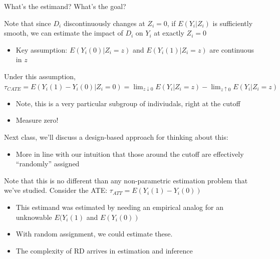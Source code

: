 \documentclass[notes,11pt, aspectratio=169]{beamer}
\newenvironment{wideitemize}{\itemize\addtolength{\itemsep}{10pt}}{\enditemize}
\begin{document}
\begin{frame}{What's the estimand? What's the goal?}
  \begin{wideitemize}
  \item Note that since $D_{i}$ discontinuously changes at
    $Z_{i} = 0$, if $E(Y_{i}|Z_{i})$ is sufficiently smooth, we can
    estimate the impact of $D_{i}$ on $Y_{i}$ at exactly $Z_{i} = 0$
    \begin{itemize}
    \item Key assumption: $E(Y_{i}(0) | Z_{i} = z)$ and
      $E(Y_{i}(1) | Z_{i} = z)$ are continuous in $z$
    \end{itemize}
  \item Under this assumption,  $\tau_{CATE} = E(Y_{i}(1) - Y_{i}(0) | Z_{i} = 0) = \lim_{z \downarrow 0}E(Y_{i} | Z_{i}= z) - \lim_{z \uparrow 0}E(Y_{i} | Z_{i}= z)$
    \begin{itemize}
    \item Note, this is a very particular subgroup of indiviudals, right at the cutoff
    \item Measure zero!
    \end{itemize}
  \item Next class, we'll discuss a design-based approach for thinking about this:
    \begin{itemize}
    \item More in line with our intuition that those around the cutoff
      are effectively ``randomly'' assigned
    \end{itemize}
  \item Note that this is no different than any non-parametric
    estimation problem that we've studied. Consider the ATE: $\tau_{ATT} = E(Y_{i}(1) - Y_{i}(0))$
    \begin{itemize}
    \item This estimand was estimated by needing an empirical analog
      for an unknowable $E(Y_{i}(1)$ and $E(Y_{i}(0))$
    \item With random assignment, we could estimate these.
    \item The complexity of RD arrives in estimation and inference
    \end{itemize}
  \end{wideitemize}
\end{frame}
\end{document}

